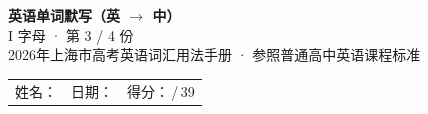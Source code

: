 \documentclass[10pt,a4paper]{article}
\begin{document}
\pagestyle{plain}

\begin{center}
{\LARGE\bfseries 英语单词默写（英 $\to$ 中）}\\[0.22em]
{\large I 字母 · 第 3 / 4 份}\\[0.18em]
{\small 2026年上海市高考英语词汇用法手册 · 参照普通高中英语课程标准}
\end{center}

\vspace{0.25em}
\noindent\begin{tabular}{@{}p{}@{}p{}@{}p{}@{}}
姓名：\underline{\hspace{2.0cm}} & 日期：\underline{\hspace{2.0cm}} & 得分：\underline{\hspace{1.3cm}}\,/\,39 \\
\end{tabular}

\vspace{0.3em}

\vspace{0.08em}
\end{document}
